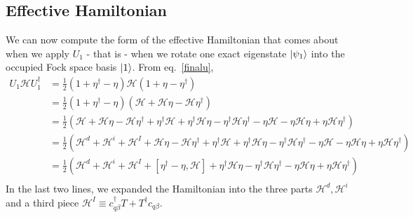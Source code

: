 \subsection*{Effective Hamiltonian}
We can now compute the form of the effective Hamiltonian that comes about when we apply \(U_1\) - that is - when we rotate one exact eigenstate \(\ket{\psi_1}\) into the occupied Fock space basis \(\ket{1}\). From eq.~\ref{finalu},
\begin{equation}\begin{aligned}
	U_1 \mathcal{H} U_1^\dagger &= \frac{1}{2}\left(1+\eta^\dagger - \eta\right)\mathcal{H}\left(1 + \eta - \eta^\dagger\right)\\
				    &= \frac{1}{2}\left(1+\eta^\dagger - \eta\right)\left(\mathcal{H} + \mathcal{H}\eta - \mathcal{H}\eta^\dagger\right)\\
				    &=\frac{1}{2}\left(\mathcal{H}+ \mathcal{H}\eta - \mathcal{H}\eta^\dagger + \eta^\dagger \mathcal{H} + \eta^\dagger\mathcal{H}\eta - \eta^\dagger \mathcal{H}\eta^\dagger - \eta\mathcal{H} - \eta \mathcal{H} \eta + \eta \mathcal{H} \eta^\dagger\right)\\
				    &=\frac{1}{2}\left(\mathcal{H}^d + \mathcal{H}^i + \mathcal{H}^I + \mathcal{H}\eta - \mathcal{H}\eta^\dagger + \eta^\dagger \mathcal{H} + \eta^\dagger\mathcal{H}\eta - \eta^\dagger \mathcal{H}\eta^\dagger - \eta\mathcal{H} - \eta \mathcal{H} \eta + \eta \mathcal{H} \eta^\dagger\right)\\
				    &=\frac{1}{2}\left(\mathcal{H}^d + \mathcal{H}^i + \mathcal{H}^I + \left[\eta^\dagger - \eta,\mathcal{H}\right] + \eta^\dagger\mathcal{H}\eta - \eta^\dagger \mathcal{H}\eta^\dagger - \eta \mathcal{H} \eta + \eta \mathcal{H} \eta^\dagger\right)\\
\end{aligned}\end{equation}
In the last two lines, we expanded the Hamiltonian into the three parts \(\mathcal{H}^d,\mathcal{H}^i\) and a third piece \(\mathcal{H}^I \equiv c_{q\beta}^\dagger T + T^\dagger c_{q\beta}\).

